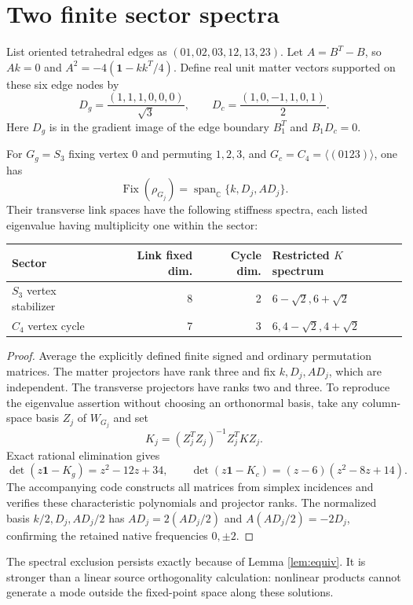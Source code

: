 \documentclass[11pt,a4paper]{article}
\newcommand{\id}{\mathbf1}\newcommand{\tr}{\operatorname{tr}}\newcommand{\diag}{\operatorname{diag}}\newcommand{\Fix}{\operatorname{Fix}}\newcommand{\Rea}{\operatorname{Re}}
\begin{document}
\newpage
\section{Two finite sector spectra}
List oriented tetrahedral edges as $(01,02,03,12,13,23)$. Let $A=B^T-B$, so $Ak=0$ and $A^2=-4(\id-kk^T/4)$. Define real unit matter vectors supported on these six edge nodes by
\[
D_g=\frac{(1,1,1,0,0,0)}{\sqrt3},\qquad
D_c=\frac{(1,0,-1,1,0,1)}2.
\]
Here $D_g$ is in the gradient image of the edge boundary $B_1^T$ and $B_1D_c=0$.

\begin{proposition}\label{prop:spec}
For $G_g=S_3$ fixing vertex $0$ and permuting $1,2,3$, and $G_c=C_4=\langle(0123)\rangle$, one has
\[
\Fix(\rho_{G_j})=\operatorname{span}_{\mathbb C}\{k,D_j,AD_j\}.
\]
Their transverse link spaces have the following stiffness spectra, each listed eigenvalue having multiplicity one within the sector:
\begin{center}
\begin{tabular}{lrrl}
\toprule
Sector & Link fixed dim. & Cycle dim. & Restricted $K$ spectrum\\
\midrule
$S_3$ vertex stabilizer & 8 & 2 & $6-\sqrt2,6+\sqrt2$\\
$C_4$ vertex cycle & 7 & 3 & $6,4-\sqrt2,4+\sqrt2$\\
\bottomrule
\end{tabular}
\end{center}
\end{proposition}
\begin{proof}
Average the explicitly defined finite signed and ordinary permutation matrices. The matter projectors have rank three and fix $k,D_j,AD_j$, which are independent. The transverse projectors have ranks two and three. To reproduce the eigenvalue assertion without choosing an orthonormal basis, take any column-space basis $Z_j$ of $W_{G_j}$ and set
\[
K_j=(Z_j^TZ_j)^{-1}Z_j^TKZ_j.
\]
Exact rational elimination gives
\[
\det(z\id-K_g)=z^2-12z+34,\qquad
\det(z\id-K_c)=(z-6)(z^2-8z+14).
\]
The accompanying code constructs all matrices from simplex incidences and verifies these characteristic polynomials and projector ranks. The normalized basis $k/2,D_j,AD_j/2$ has $AD_j=2(AD_j/2)$ and $A(AD_j/2)=-2D_j$, confirming the retained native frequencies $0,\pm2$.
\end{proof}
The spectral exclusion persists exactly because of Lemma \ref{lem:equiv}. It is stronger than a linear source orthogonality calculation: nonlinear products cannot generate a mode outside the fixed-point space along these solutions.
\end{document}
